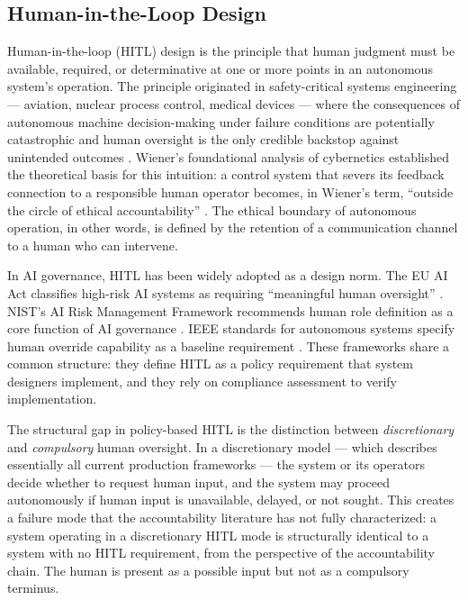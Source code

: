 \subsection{Human-in-the-Loop Design}\label{sec:hitl}

Human-in-the-loop (HITL) design is the principle that human judgment must be available, required, or determinative at one or more points in an autonomous system's operation. The principle originated in safety-critical systems engineering --- aviation, nuclear process control, medical devices --- where the consequences of autonomous machine decision-making under failure conditions are potentially catastrophic and human oversight is the only credible backstop against unintended outcomes \cite{bansal2019}. Wiener's foundational analysis of cybernetics established the theoretical basis for this intuition: a control system that severs its feedback connection to a responsible human operator becomes, in Wiener's term, ``outside the circle of ethical accountability'' \cite{wiener1948}. The ethical boundary of autonomous operation, in other words, is defined by the retention of a communication channel to a human who can intervene.

In AI governance, HITL has been widely adopted as a design norm. The EU AI Act classifies high-risk AI systems as requiring ``meaningful human oversight'' \cite{eua2024}. NIST's AI Risk Management Framework recommends human role definition as a core function of AI governance \cite{nist2023}. IEEE standards for autonomous systems specify human override capability as a baseline requirement \cite{ieee2024autonomous}. These frameworks share a common structure: they define HITL as a policy requirement that system designers implement, and they rely on compliance assessment to verify implementation.

The structural gap in policy-based HITL is the distinction between \emph{discretionary} and \emph{compulsory} human oversight. In a discretionary model --- which describes essentially all current production frameworks --- the system or its operators decide whether to request human input, and the system may proceed autonomously if human input is unavailable, delayed, or not sought. This creates a failure mode that the accountability literature has not fully characterized: a system operating in a discretionary HITL mode is structurally identical to a system with no HITL requirement, from the perspective of the accountability chain. The human is present as a possible input but not as a compulsory terminus.


